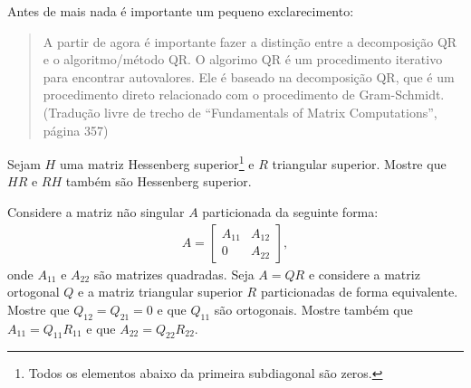\documentclass[a4paper,12pt, leqno, answers]{exam}
\begin{document}
\thispagestyle{empty}

\newpage
\setcounter{page}{1}
Antes de mais nada \'{e} importante um pequeno exclarecimento:
\begin{quote}
    A partir de agora \'{e} importante fazer a distin\c{c}\~{a}o entre a decomposi\c{c}\~{a}o QR e o algoritmo/m\'{e}todo QR. O algorimo QR \'{e} um procedimento iterativo para encontrar autovalores. Ele \'{e} baseado na decomposi\c{c}\~{a}o QR, que \'{e} um procedimento direto relacionado com o procedimento de Gram-Schmidt. (Tradu\c{c}\~{a}o livre de trecho de ``Fundamentals of Matrix Computations''\nocite{Watkins:2004:fundamentals}, p\'{a}gina 357)
\end{quote}
\begin{questions}
    \question Sejam $H$ uma matriz Hessenberg superior\footnote{Todos os elementos abaixo da primeira subdiagonal s\~{a}o zeros.} e $R$ triangular superior. Mostre que $H R$ e $R H$ tamb\'{e}m s\~{a}o Hessenberg superior.
    \begin{solution}
    \end{solution}

    \question Considere a matriz n\~{a}o singular $A$ particionada da seguinte forma:
    \begin{align*}
        A = \begin{bmatrix}
            A_{11} & A_{12} \\
            0 & A_{22}
        \end{bmatrix},
    \end{align*}
    onde $A_{11}$ e $A_{22}$ s\~{a}o matrizes quadradas. Seja $A = Q R$ e considere a matriz ortogonal $Q$ e a matriz triangular superior $R$ particionadas de forma equivalente. Mostre que $Q_{12} = Q_{21} = 0$ e que $Q_{11}$ s\~{a}o ortogonais. Mostre tamb\'{e}m que $A_{11} = Q_{11} R_{11}$ e que $A_{22} = Q_{22} R_{22}$.
    \begin{solution}
    \end{solution}


\end{questions}
\end{document}
